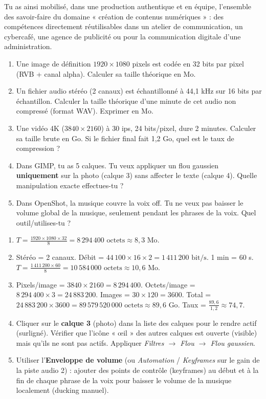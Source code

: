 \documentclass[11pt]{article}
\begin{document}
Tu as ainsi mobilisé, dans une production authentique et en équipe, l'ensemble des savoir-faire du domaine « création de contenus numériques » : des compétences directement réutilisables dans un atelier de communication, un cybercafé, une agence de publicité ou pour la communication digitale d'une administration.

\begin{exercice}
\begin{enumerate}
  \item Une image de définition $1920 \times 1080$ pixels est codée en 32 bits par pixel (RVB + canal alpha). Calculer sa taille théorique en Mo.
  \item Un fichier audio stéréo (2 canaux) est échantillonné à 44,1 kHz sur 16 bits par échantillon. Calculer la taille théorique d'une minute de cet audio non compressé (format WAV). Exprimer en Mo.
  \item Une vidéo 4K ($3840 \times 2160$) à 30 ips, 24 bits/pixel, dure 2 minutes. Calculer sa taille brute en Go. Si le fichier final fait 1,2 Go, quel est le taux de compression ?
  \item Dans GIMP, tu as 5 calques. Tu veux appliquer un flou gaussien \textbf{uniquement} sur la photo (calque 3) sans affecter le texte (calque 4). Quelle manipulation exacte effectues-tu ?
  \item Dans OpenShot, la musique couvre la voix off. Tu ne veux pas baisser le volume global de la musique, seulement pendant les phrases de la voix. Quel outil/utilises-tu ?
\end{enumerate}
\end{exercice}

\begin{corrige}[Exercice n°1]
\begin{enumerate}
  \item $T = \frac{1920 \times 1080 \times 32}{8} = 8\,294\,400 \text{ octets} \approx 8,3 \text{ Mo}$.
  \item Stéréo = 2 canaux. Débit = $44\,100 \times 16 \times 2 = 1\,411\,200 \text{ bit/s}$. 1 min = 60 s. $T = \frac{1\,411\,200 \times 60}{8} = 10\,584\,000 \text{ octets} \approx 10,6 \text{ Mo}$.
  \item Pixels/image = $3840 \times 2160 = 8\,294\,400$. Octets/image = $8\,294\,400 \times 3 = 24\,883\,200$. Images = $30 \times 120 = 3600$. Total = $24\,883\,200 \times 3600 = 89\,579\,520\,000 \text{ octets} \approx 89,6 \text{ Go}$. Taux = $\frac{89,6}{1,2} \approx 74,7$.
  \item Cliquer sur le \textbf{calque 3} (photo) dans la liste des calques pour le rendre actif (surligné). Vérifier que l'icône « œil » des autres calques est ouverte (visible) mais qu'ils ne sont pas actifs. Appliquer \emph{Filtres $\rightarrow$ Flou $\rightarrow$ Flou gaussien}.
  \item Utiliser l'\textbf{Enveloppe de volume} (ou \emph{Automation} / \emph{Keyframes} sur le gain de la piste audio 2) : ajouter des points de contrôle (keyframes) au début et à la fin de chaque phrase de la voix pour baisser le volume de la musique localement (ducking manuel).
\end{enumerate}
\end{corrige}
\end{document}
